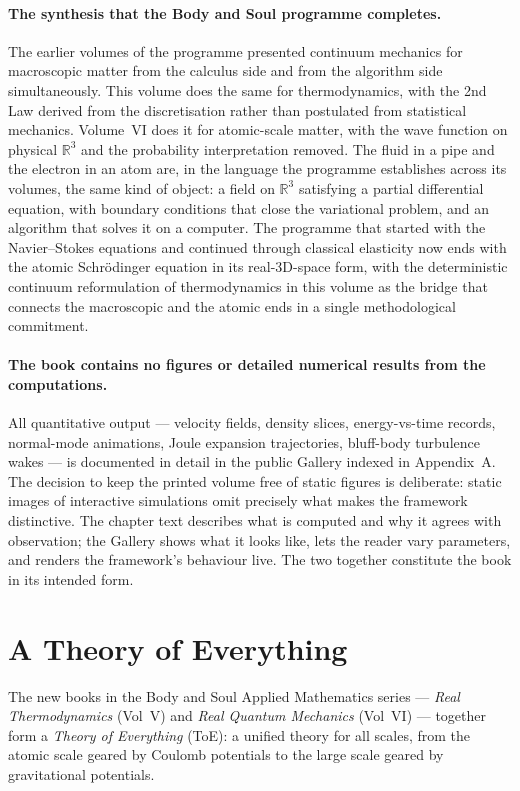 \paragraph{The synthesis that the Body and Soul programme completes.}
The earlier volumes of the programme presented continuum mechanics for macroscopic matter from the calculus side and from the algorithm side simultaneously. This volume does the same for thermodynamics, with the 2nd Law derived from the discretisation rather than postulated from statistical mechanics. Volume~VI does it for atomic-scale matter, with the wave function on physical $\mathbb{R}^3$ and the probability interpretation removed. The fluid in a pipe and the electron in an atom are, in the language the programme establishes across its volumes, the same kind of object: a field on $\mathbb{R}^3$ satisfying a partial differential equation, with boundary conditions that close the variational problem, and an algorithm that solves it on a computer. The programme that started with the Navier--Stokes equations and continued through classical elasticity now ends with the atomic Schr\"odinger equation in its real-3D-space form, with the deterministic continuum reformulation of thermodynamics in this volume as the bridge that connects the macroscopic and the atomic ends in a single methodological commitment.

\paragraph{The book contains no figures or detailed numerical results from the computations.}
All quantitative output --- velocity fields, density slices, energy-vs-time records, normal-mode animations, Joule expansion trajectories, bluff-body turbulence wakes --- is documented in detail in the public Gallery indexed in Appendix~A. The decision to keep the printed volume free of static figures is deliberate: static images of interactive simulations omit precisely what makes the framework distinctive. The chapter text describes what is computed and why it agrees with observation; the Gallery shows what it looks like, lets the reader vary parameters, and renders the framework's behaviour live. The two together constitute the book in its intended form.

\section*{A Theory of Everything}

The new books in the Body and Soul Applied Mathematics series --- \emph{Real
Thermodynamics} (Vol~V) and \emph{Real Quantum Mechanics} (Vol~VI) --- together
form a \emph{Theory of Everything} (ToE): a unified theory for all scales, from
the atomic scale geared by Coulomb potentials to the large scale geared by
gravitational potentials.

